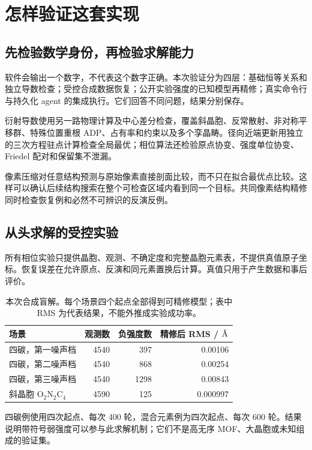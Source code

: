 \chapter{怎样验证这套实现}
\label{chap:validation}
\section{先检验数学身份，再检验求解能力}
软件会输出一个数字，不代表这个数字正确。本次验证分为四层：基础恒等关系和独立导数检查；受控合成数据恢复；公开实验强度的已知模型再精修；真实命令行与持久化 agent 的集成执行。它们回答不同问题，结果分别保存。

衍射导数使用另一路物理计算及中心差分检查，覆盖斜晶胞、反常散射、非对称平移群、特殊位置重根 ADP、占有率和约束以及多个孪晶畴。径向近端更新用独立的三次方程驻点计算检查全局最优；相位算法还检验原点协变、强度单位协变、Friedel 配对和保留集不泄漏。

像素压缩对任意结构预测与原始像素直接剖面比较，而不只在拟合最优点比较。这样可以确认后续结构搜索在整个可检查区域内看到同一个目标。共同像素结构精修同时检查恢复例和必然不可辨识的反演反例。

\section{从头求解的受控实验}
所有相位实验只提供晶胞、观测、不确定度和完整晶胞元素表，不提供真值原子坐标。恢复误差在允许原点、反演和同元素置换后计算。真值只用于产生数据和事后评价。

\begin{table}[tb]
\centering\small
\caption{本次合成盲解。每个场景四个起点全部得到可精修模型；表中 RMS 为代表结果，不能外推成实验成功率。}
\begin{tabularx}{\textwidth}{@{}Xrrr@{}}
\toprule 场景 & 观测数 & 负强度数 & 精修后 RMS / $\text{\AA}$\\\midrule
四碳，第一噪声档 & 4540 & 397 & 0.00106\\
四碳，第二噪声档 & 4540 & 868 & 0.00254\\
四碳，第三噪声档 & 4540 & 1298 & 0.00843\\
斜晶胞 O$_2$N$_2$C$_4$ & 4590 & 125 & 0.000997\\
\bottomrule
\end{tabularx}
\end{table}

四碳例使用四次起点、每次 400 轮，混合元素例为四次起点、每次 600 轮。结果说明带符号弱强度可以参与此求解机制；它们不是高无序 MOF、大晶胞或未知组成的验证集。

